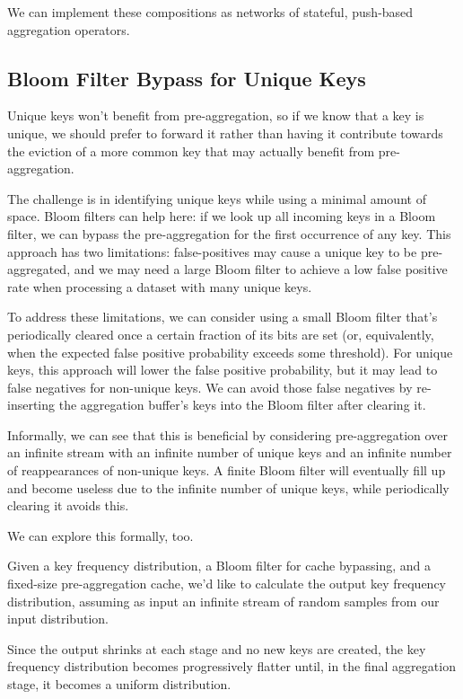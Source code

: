 \documentclass[12pt]{article}
\begin{document}
We can implement these compositions as networks of stateful, push-based
aggregation operators.

\subsection{Bloom Filter Bypass for Unique Keys}
Unique keys won't benefit from pre-aggregation, so if we know that a key is
unique, we should prefer to forward it rather than having it contribute
towards the eviction of a more common key that may actually benefit from
pre-aggregation.

The challenge is in identifying unique keys while using a minimal amount of
space.  Bloom filters can help here: if we look up all incoming keys in
a Bloom filter, we can bypass the pre-aggregation for the first occurrence of
any key.  This approach has two limitations: false-positives may cause
a unique key to be pre-aggregated, and we may need a large Bloom filter to
achieve a low false positive rate when processing a dataset with many unique
keys.

To address these limitations, we can consider using a small Bloom filter that's
periodically cleared once a certain fraction of its bits are set (or,
equivalently, when the expected false positive probability exceeds some
threshold).  For unique keys, this approach will lower the false positive
probability, but it may lead to false negatives for non-unique keys.
We can avoid those false negatives by re-inserting the aggregation buffer's
keys into the Bloom filter after clearing it.


Informally, we can see that this is beneficial by considering pre-aggregation
over an infinite stream with an infinite number of unique keys and an infinite
number of reappearances of non-unique keys.  A finite Bloom filter will
eventually fill up and become useless due to the infinite number of unique
keys, while periodically clearing it avoids this.

We can explore this formally, too.

Given a key frequency distribution, a Bloom filter for cache bypassing, and
a fixed-size pre-aggregation cache, we'd like to calculate the output key
frequency distribution, assuming as input an infinite stream of random samples
from our input distribution.

Since the output shrinks at each stage and no new keys are created, the key
frequency distribution becomes progressively flatter until, in the final
aggregation stage, it becomes a uniform distribution.
\end{document}
